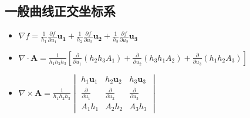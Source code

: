 \documentclass{ctexart}
\begin{document}
\subsection{一般曲线正交坐标系}
\begin{itemize}
\item	$ \nabla f = \frac{1}{h_1}\frac{\partial f}{\partial u_1}\mathbf{u_1} 
		+ \frac{1}{h_2}\frac{\partial f}{\partial u_2}\mathbf{u_2} 
		+ \frac{1}{h_3}\frac{\partial f}{\partial u_2}\mathbf{u_3} $
\item	$ \nabla\cdot\mathbf{A} 
		= \frac{1}{h_1 h_2 h_3}[\frac{\partial}{\partial u_1}(h_2 h_3 A_1) 
		+ \frac{\partial}{\partial u_2}(h_3 h_1 A_2) 
		+ \frac{\partial}{\partial u_3}(h_1 h_2 A_3) ]
	$
\item	$ \nabla\times\mathbf{A} = \frac{1}{h_1 h_2 h_3} 
		\begin{vmatrix} 
			h_1 \mathbf{u}_1 & h_2 \mathbf{u}_2 & h_3 \mathbf{u}_3 \\ 
			\frac{\partial}{\partial u_1} & \frac{\partial}{\partial u_2} & \frac {\partial}{\partial u_3} \\ 
			A_1 h_1 & A_2 h_2 & A_3 h_3
		\end{vmatrix} 
	$
\end{itemize}
\end{document}

